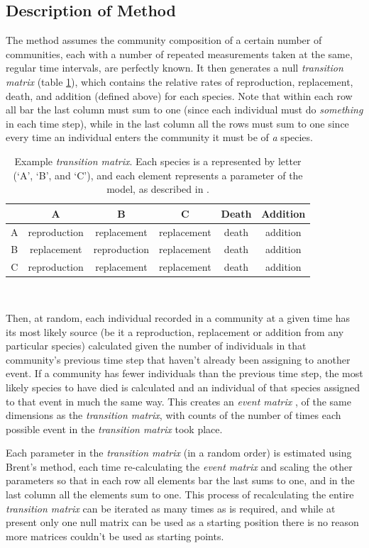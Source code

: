 \documentclass[12pt]{amsart}
\begin{document}
\subsection{Description of Method}
The method assumes the community composition of a certain number of communities, each with a number of repeated measurements taken at the same, regular time intervals, are perfectly known. It then generates a null \emph{transition matrix} (table \ref{transMatEg}), which contains the relative rates of reproduction, replacement, death, and addition (defined above) for each species. Note that within each row all bar the last column must sum to one (since each individual must do \emph{something} in each time step), while in the last column all the rows must sum to one since every time an individual enters the community it must be of \emph{a} species.
\begin{table}
\begin{center}
\begin{tabular}{c|cccc|c}
&A&B&C&Death&Addition\\ \hline
A&reproduction&replacement&replacement&death&addition\\
B&replacement&reproduction&replacement&death&addition\\
C&reproduction&replacement&replacement&death&addition\\
\end{tabular}\\
\caption{Example \emph{transition matrix}. Each species is a represented by letter (`A', `B', and `C'), and each element represents a parameter of the model, as described in .}\label{transMatEg}
\end{center}
\end{table}

Then, at random, each individual recorded in a community at a given time has its most likely source (be it a reproduction, replacement or addition from any particular species) calculated given the number of individuals in that community's previous time step that haven't already been assigning to another event. If a community has fewer individuals than the previous time step, the most likely species to have died is calculated and an individual of that species assigned to that event in much the same way. This creates an \emph{event matrix} , of the same dimensions as the \emph{transition matrix}, with counts of the number of times each possible event in the \emph{transition matrix} took place.

Each parameter in the \emph{transition matrix} (in a random order) is estimated using Brent's method, each time re-calculating the \emph{event matrix}  and scaling the other parameters so that in each row all elements bar the last sums to one, and in the last column all the elements sum to one. This process of recalculating the entire \emph{transition matrix} can be iterated as many times as is required, and while at present only one null matrix can be used as a starting position there is no reason more matrices couldn't be used as starting points.
\end{document}
